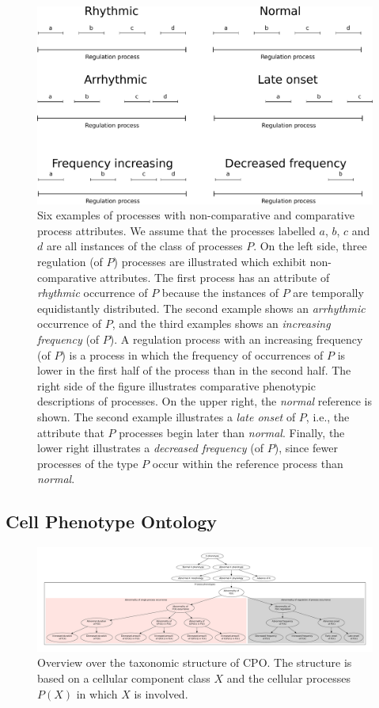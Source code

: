 \documentclass{bioinfo}
\begin{document}
\begin{figure}
  \centering
  \includegraphics[width=.5\textwidth]{processpatterns.pdf}
  
  \caption{\label{fig:patterns}Six examples of processes with
    non-comparative and comparative process attributes.  We assume
    that the processes labelled $a$, $b$, $c$ and $d$ are all
    instances of the class of processes $P$.  On the left side, three
    regulation (of $P$) processes are illustrated which exhibit
    non-comparative attributes. The first process has an attribute of
    {\em rhythmic} occurrence of $P$ because the instances of $P$ are
    temporally equidistantly distributed. The second example shows an
    {\em arrhythmic} occurrence of $P$, and the third examples shows
    an {\em increasing frequency} (of $P$). A regulation process with
    an increasing frequency (of $P$) is a process in which the
    frequency of occurrences of $P$ is lower in the first half of the
    process than in the second half. The right side of the figure
    illustrates comparative phenotypic descriptions of processes. On
    the upper right, the {\em normal} reference is shown. The second
    example illustrates a {\em late onset} of $P$, i.e., the attribute
    that $P$ processes begin later than {\em normal}. Finally, the
    lower right illustrates a {\em decreased frequency} (of $P$),
    since fewer processes of the type $P$ occur within the reference
    process than {\em normal}.}
\end{figure}


\subsection{Cell Phenotype Ontology}
\begin{figure}
  \centering
  \includegraphics[width=\textwidth,
  height=.33\textheight]{overview.pdf}
  \caption{Overview over the taxonomic structure of CPO. The structure
    is based on a cellular component class $X$ and the cellular
    processes $P(X)$ in which $X$ is involved.\label{fig:overview}}
\end{figure}
\end{document}
